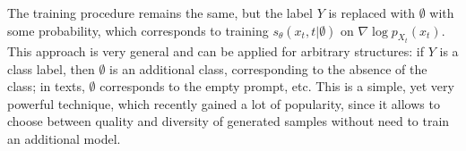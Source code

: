 The training procedure remains the same, but the label $Y$ is replaced with $\emptyset$ with some probability, which corresponds to training $s_\theta(x_t, t | \emptyset)$ on $\nabla \log p_{X_t}(x_t)$. This approach is very general and can be applied for arbitrary structures: if $Y$ is a class label, then $\emptyset$ is an additional class, corresponding to the absence of the class; in texts, $\emptyset$ corresponds to the empty prompt, etc. This is a simple, yet very powerful technique, which recently gained a lot of popularity, since it allows to choose between quality and diversity of generated samples without need to train an additional model.











